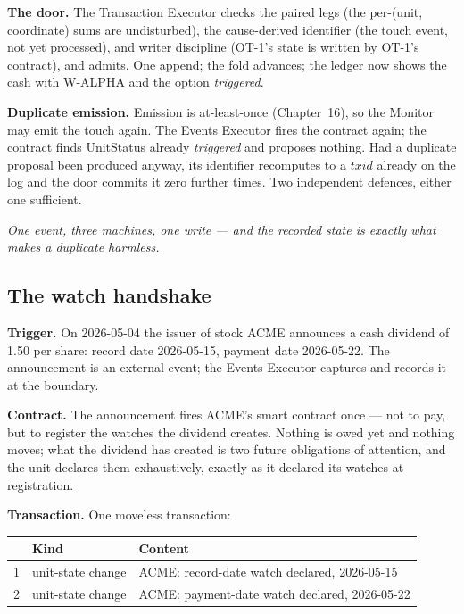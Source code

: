 \textbf{The door.} The Transaction Executor checks the paired legs (the
per-(unit, coordinate) sums are undisturbed), the cause-derived identifier (the
touch event, not yet processed), and writer discipline (OT-1's state is written
by OT-1's contract), and admits. One append; the fold advances; the ledger now
shows the cash with \mbox{W-ALPHA} and the option \emph{triggered}.

\textbf{Duplicate emission.} Emission is at-least-once (Chapter~16), so the
Monitor may emit the touch again. The Events Executor fires the contract again;
the contract finds UnitStatus already \emph{triggered} and proposes nothing.
Had a duplicate proposal been produced anyway, its identifier recomputes to a
$\mathit{txid}$ already on the log and the door commits it zero further times. Two
independent defences, either one sufficient.

\emph{One event, three machines, one write --- and the recorded state is
exactly what makes a duplicate harmless.}

\subsection{The watch handshake}

\textbf{Trigger.} On 2026-05-04 the issuer of stock ACME announces a cash
dividend of 1.50 per share: record date 2026-05-15, payment date 2026-05-22.
The announcement is an external event; the Events Executor captures and records
it at the boundary.

\textbf{Contract.} The announcement fires ACME's smart contract once --- not to
pay, but to register the watches the dividend creates. Nothing is owed yet and
nothing moves; what the dividend has created is two future obligations of
attention, and the unit declares them exhaustively, exactly as it declared its
watches at registration.

\textbf{Transaction.} One moveless transaction:

\begin{center}
\begin{tabular}{@{}rll@{}}
\toprule
 & Kind & Content \\
\midrule
1 & unit-state change & ACME: record-date watch declared, 2026-05-15 \\
2 & unit-state change & ACME: payment-date watch declared, 2026-05-22 \\
\bottomrule
\end{tabular}
\end{center}

